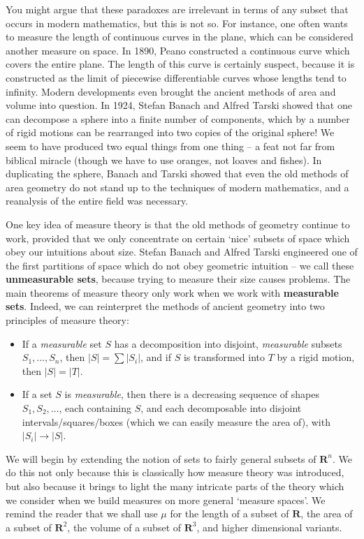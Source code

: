 You might argue that these paradoxes are irrelevant in terms of any subset that occurs in modern mathematics, but this is not so. For instance, one often wants to measure the length of continuous curves in the plane, which can be considered another measure on space. In 1890, Peano constructed a continuous curve which covers the entire plane. The length of this curve is certainly suspect, because it is constructed as the limit of piecewise differentiable curves whose lengths tend to infinity. Modern developments even brought the ancient methods of area and volume into question. In 1924, Stefan Banach and Alfred Tarski showed that one can decompose a sphere into a finite number of components, which by a number of rigid motions can be rearranged into two copies of the original sphere! We seem to have produced two equal things from one thing -- a feat not far from biblical miracle (though we have to use oranges, not loaves and fishes). In duplicating the sphere, Banach and Tarski showed that even the old methods of area geometry do not stand up to the techniques of modern mathematics, and a reanalysis of the entire field was necessary.

One key idea of measure theory is that the old methods of geometry continue to work, provided that we only concentrate on certain `nice' subsets of space which obey our intuitions about size. Stefan Banach and Alfred Tarski engineered one of the first partitions of space which do not obey geometric intuition -- we call these {\bf unmeasurable sets}, because trying to measure their size causes problems. The main theorems of measure theory only work when we work with {\bf measurable sets}. Indeed, we can reinterpret the methods of ancient geometry into two principles of measure theory:
%
\begin{itemize}
    \item If a {\it measurable} set $S$ has a decomposition into disjoint, {\it measurable} subsets $S_1, \dots, S_n$, then $|S| = \sum |S_i|$, and if $S$ is transformed into $T$ by a rigid motion, then $|S| = |T|$.

    \item If a set $S$ is {\it measurable}, then there is a decreasing sequence of shapes $S_1, S_2, \dots$, each containing $S$, and each decomposable into disjoint intervals/squares/boxes (which we can easily measure the area of), with $|S_i| \to |S|$.
\end{itemize}
%
We will begin by extending the notion of sets to fairly general subsets of $\mathbf{R}^n$. We do this not only because this is classically how measure theory was introduced, but also because it brings to light the many intricate parts of the theory which we consider when we build measures on more general `measure spaces'. We remind the reader that we shall use $\mu$ for the length of a subset of $\mathbf{R}$, the area of a subset of $\mathbf{R}^2$, the volume of a subset of $\mathbf{R}^3$, and higher dimensional variants.


